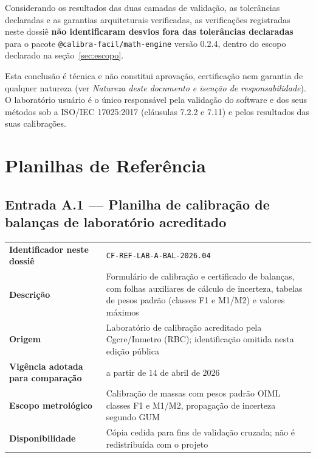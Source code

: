 \documentclass[11pt,a4paper]{article}
\newcommand{\docVersion}{0.2.4}
\begin{document}
Considerando os resultados das duas camadas de validação, as tolerâncias declaradas e as garantias arquiteturais verificadas, as verificações registradas neste dossiê \textbf{não identificaram desvios fora das tolerâncias declaradas} para o pacote \texttt{@calibra-facil/math-engine} versão \docVersion{}, dentro do escopo declarado na seção~\ref{sec:escopo}.

Esta conclusão é técnica e não constitui aprovação, certificação nem garantia de qualquer natureza (ver \emph{Natureza deste documento e isenção de responsabilidade}). O laboratório usuário é o único responsável pela validação do software e dos seus métodos sob a ISO/IEC 17025:2017 (cláusulas 7.2.2 e 7.11) e pelos resultados das suas calibrações.

\appendix

\section{Planilhas de Referência}
\label{app:planilhas}

\subsection{Entrada A.1 --- Planilha de calibração de balanças de laboratório acreditado}

\begin{tabularx}{\textwidth}{l X}
  \toprule
  \textbf{Identificador neste dossiê} & \texttt{CF-REF-LAB-A-BAL-2026.04} \\
  \textbf{Descrição} & Formulário de calibração e certificado de balanças, com folhas auxiliares de cálculo de incerteza, tabelas de pesos padrão (classes F1 e M1/M2) e valores máximos \\
  \textbf{Origem} & Laboratório de calibração acreditado pela Cgcre/Inmetro (RBC); identificação omitida nesta edição pública \\
  \textbf{Vigência adotada para comparação} & a partir de 14 de abril de 2026 \\
  \textbf{Escopo metrológico} & Calibração de massas com pesos padrão OIML classes F1 e M1/M2, propagação de incerteza segundo GUM \\
  \textbf{Disponibilidade} & Cópia cedida para fins de validação cruzada; não é redistribuída com o projeto \\
  \bottomrule
\end{tabularx}
\end{document}
